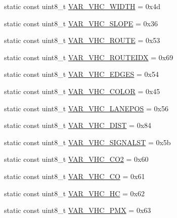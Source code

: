\begin{DoxyCompactItemize}
\item 
static const uint8\+\_\+t \hyperlink{classtraci__api_1_1_vehicle_manager_a8cb7a25163b002f45f977097a48b3173}{V\+A\+R\+\_\+\+V\+H\+C\+\_\+\+W\+I\+D\+TH} = 0x4d
\item 
static const uint8\+\_\+t \hyperlink{classtraci__api_1_1_vehicle_manager_a3a811ad4c585a47e9af5fb779a7f97af}{V\+A\+R\+\_\+\+V\+H\+C\+\_\+\+S\+L\+O\+PE} = 0x36
\item 
static const uint8\+\_\+t \hyperlink{classtraci__api_1_1_vehicle_manager_ae6e60c94547d3c6c179c881412a6255f}{V\+A\+R\+\_\+\+V\+H\+C\+\_\+\+R\+O\+U\+TE} = 0x53
\item 
static const uint8\+\_\+t \hyperlink{classtraci__api_1_1_vehicle_manager_a4140fe8382dab1e6dff7d3f6e9116118}{V\+A\+R\+\_\+\+V\+H\+C\+\_\+\+R\+O\+U\+T\+E\+I\+DX} = 0x69
\item 
static const uint8\+\_\+t \hyperlink{classtraci__api_1_1_vehicle_manager_a8ab2241fc88ed80e3f3d4d98930aba13}{V\+A\+R\+\_\+\+V\+H\+C\+\_\+\+E\+D\+G\+ES} = 0x54
\item 
static const uint8\+\_\+t \hyperlink{classtraci__api_1_1_vehicle_manager_a0b76367bca4bf07cb0536cde315201cb}{V\+A\+R\+\_\+\+V\+H\+C\+\_\+\+C\+O\+L\+OR} = 0x45
\item 
static const uint8\+\_\+t \hyperlink{classtraci__api_1_1_vehicle_manager_a430064914b1070d671a96da2bfe76a05}{V\+A\+R\+\_\+\+V\+H\+C\+\_\+\+L\+A\+N\+E\+P\+OS} = 0x56
\item 
static const uint8\+\_\+t \hyperlink{classtraci__api_1_1_vehicle_manager_a86c531540a0204452880c419c16c0076}{V\+A\+R\+\_\+\+V\+H\+C\+\_\+\+D\+I\+ST} = 0x84
\item 
static const uint8\+\_\+t \hyperlink{classtraci__api_1_1_vehicle_manager_a518145e656c215e818588470a5b05ed3}{V\+A\+R\+\_\+\+V\+H\+C\+\_\+\+S\+I\+G\+N\+A\+L\+ST} = 0x5b
\item 
static const uint8\+\_\+t \hyperlink{classtraci__api_1_1_vehicle_manager_a6970833b58d743a2cb22a3db09e5f11b}{V\+A\+R\+\_\+\+V\+H\+C\+\_\+\+C\+O2} = 0x60
\item 
static const uint8\+\_\+t \hyperlink{classtraci__api_1_1_vehicle_manager_a6636934f7ce50a95e51d044d118fb904}{V\+A\+R\+\_\+\+V\+H\+C\+\_\+\+CO} = 0x61
\item 
static const uint8\+\_\+t \hyperlink{classtraci__api_1_1_vehicle_manager_a96ad8b90c3272d7bb7efe3b64501929d}{V\+A\+R\+\_\+\+V\+H\+C\+\_\+\+HC} = 0x62
\item 
static const uint8\+\_\+t \hyperlink{classtraci__api_1_1_vehicle_manager_a76e6186f36d9b755f2dc579a4d57c622}{V\+A\+R\+\_\+\+V\+H\+C\+\_\+\+P\+MX} = 0x63

\end{DoxyCompactItemize}
